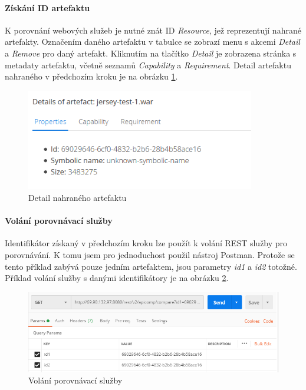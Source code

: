 \documentclass[czech,DP]{thesiskiv}
\begin{document}
\paragraph{Získání ID artefaktu}
K porovnání webových služeb je nutné znát ID \textit{Resource}, jež reprezentují nahrané artefakty. Označením daného artefaktu v tabulce se zobrazí menu s akcemi \textit{Detail} a \textit{Remove} pro daný artefakt. Kliknutím na tlačítko \textit{Detail} je zobrazena stránka s metadaty artefaktu, včetně seznamů \textit{Capability} a \textit{Requirement}. Detail artefaktu nahraného v předchozím kroku je na obrázku \ref{fig:crce-art-detail}.

\begin{figure}[h]
	\centering
	\includegraphics[width=10cm]{crce-art-detail.png}
	\caption{Detail nahraného artefaktu}
	\label{fig:crce-art-detail}
\end{figure}

\paragraph{Volání porovnávací služby}
Identifikátor získaný v předchozím kroku lze použít k volání REST služby pro porovnávání. K tomu jsem pro jednoduchost použil nástroj Postman. Protože se tento příklad zabývá pouze jedním artefaktem, jsou parametry \textit{id1} a \textit{id2} totožné. Příklad volání služby s danými identifikátory je na obrázku \ref{fig:apicomp-call}.

\begin{figure}[h]
	\centering
	\includegraphics[width=\linewidth]{apicomp-call.png}
	\caption{Volání porovnávací služby}
	\label{fig:apicomp-call}
\end{figure}
\end{document}
